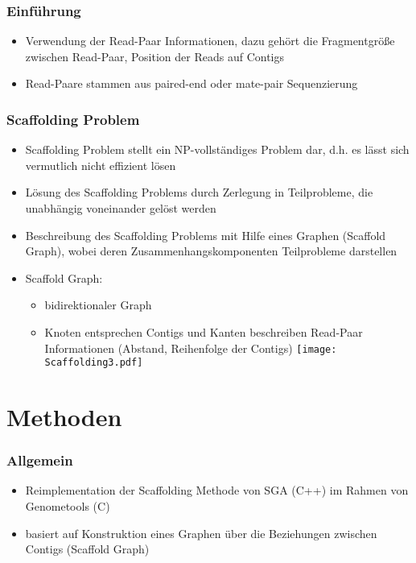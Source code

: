 \documentclass[xcolor=pst]{beamer}
\begin{document}
\begin{frame}
  \frametitle{Einführung}
  \begin{itemize}
  \item Verwendung der Read-Paar Informationen, dazu gehört die
    Fragmentgröße zwischen Read-Paar, Position der Reads auf Contigs
  \item Read-Paare stammen aus paired-end oder mate-pair Sequenzierung
  \end{itemize}
\end{frame}

\begin{frame}
  \frametitle{Scaffolding Problem}
  \begin{itemize}
  \item Scaffolding Problem stellt ein NP-vollständiges Problem
    dar, d.h. es lässt sich vermutlich nicht effizient lösen
  \item Lösung des Scaffolding Problems durch Zerlegung in
    Teilprobleme, die unabhängig voneinander gelöst werden
  \item Beschreibung des Scaffolding Problems mit Hilfe eines
    Graphen (Scaffold Graph), wobei deren Zusammenhangskomponenten
    Teilprobleme darstellen
  \item Scaffold Graph:
    \begin{itemize}
    \item bidirektionaler Graph
    \item Knoten entsprechen Contigs und Kanten beschreiben Read-Paar
      Informationen (Abstand, Reihenfolge der Contigs)
    \texttt{[image: Scaffolding3.pdf]}
    \end{itemize}
  \end{itemize}
\end{frame}

\section{Methoden}
\begin{frame}
  \frametitle{Allgemein}
  \begin{itemize}
  \item Reimplementation der Scaffolding Methode von SGA (C++) im
    Rahmen von Genometools (C)
  \item basiert auf Konstruktion eines Graphen über die Beziehungen
    zwischen Contigs (Scaffold Graph)
  \end{itemize}
\end{frame}
\end{document}
